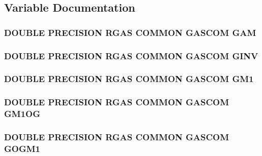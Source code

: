 \subsection{Variable Documentation}
\hypertarget{pfcgas_8com_a1a3451daf1c485e36b8a5c33f7b432c9}{
\subsubsection[{G\-A\-M}]{\setlength{\rightskip}{0pt plus 5cm}D\-O\-U\-B\-L\-E P\-R\-E\-C\-I\-S\-I\-O\-N R\-G\-A\-S C\-O\-M\-M\-O\-N G\-A\-S\-C\-O\-M G\-A\-M}}\label{pfcgas_8com_a1a3451daf1c485e36b8a5c33f7b432c9}
\hypertarget{pfcgas_8com_ae4bbdc7810f251329ba4e865a20796ec}{
\subsubsection[{G\-I\-N\-V}]{\setlength{\rightskip}{0pt plus 5cm}D\-O\-U\-B\-L\-E P\-R\-E\-C\-I\-S\-I\-O\-N R\-G\-A\-S C\-O\-M\-M\-O\-N G\-A\-S\-C\-O\-M G\-I\-N\-V}}\label{pfcgas_8com_ae4bbdc7810f251329ba4e865a20796ec}
\hypertarget{pfcgas_8com_a6cd8b68ed9e1d13b52b7c4b6de87b1c7}{
\subsubsection[{G\-M1}]{\setlength{\rightskip}{0pt plus 5cm}D\-O\-U\-B\-L\-E P\-R\-E\-C\-I\-S\-I\-O\-N R\-G\-A\-S C\-O\-M\-M\-O\-N G\-A\-S\-C\-O\-M G\-M1}}\label{pfcgas_8com_a6cd8b68ed9e1d13b52b7c4b6de87b1c7}
\hypertarget{pfcgas_8com_a187acc2efbf381a4da92c8a3cc1902ae}{
\subsubsection[{G\-M1\-O\-G}]{\setlength{\rightskip}{0pt plus 5cm}D\-O\-U\-B\-L\-E P\-R\-E\-C\-I\-S\-I\-O\-N R\-G\-A\-S C\-O\-M\-M\-O\-N G\-A\-S\-C\-O\-M G\-M1\-O\-G}}\label{pfcgas_8com_a187acc2efbf381a4da92c8a3cc1902ae}
\hypertarget{pfcgas_8com_ad60f4356829a6107f5ecf84f7927c34b}{
\subsubsection[{G\-O\-G\-M1}]{\setlength{\rightskip}{0pt plus 5cm}D\-O\-U\-B\-L\-E P\-R\-E\-C\-I\-S\-I\-O\-N R\-G\-A\-S C\-O\-M\-M\-O\-N G\-A\-S\-C\-O\-M G\-O\-G\-M1}}\label{pfcgas_8com_ad60f4356829a6107f5ecf84f7927c34b}
